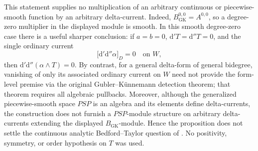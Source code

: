 \begin{proposition}
This statement supplies no multiplication of an arbitrary continuous or
piecewise-smooth function by an arbitrary delta-current.  Indeed,
\(B_{\mathrm{GK}}^{0,0}=A^{0,0}\), so a degree-zero multiplier in the
displayed module is smooth.  In this smooth degree-zero case there is a
useful sharper conclusion: if \(a=b=0\),
\(\mathrm d'T=\mathrm d''T=0\), and the single ordinary current
\begin{equation}
 \bigl[\mathrm d'\mathrm d''\alpha\bigr]_{D}=0
 \quad\text{on }W,
 \label{eq:p21p3-smooth-single-current}
\end{equation}
then \(\mathrm d'\mathrm d''(\alpha\wedge T)=0\).  By contrast, for a
general delta-form of general bidegree, vanishing of only its associated
ordinary current on \(W\) need not provide the form-level premise via the
original Gubler--K\"unnemann detection theorem; that theorem requires all
algebraic pullbacks.  Moreover, although the generalized piecewise-smooth
space \(P\!S\!P\) is an algebra and its elements define delta-currents, the
construction does not furnish a \(P\!S\!P\)-module structure on arbitrary
delta-currents extending the displayed \(B_{\mathrm{GK}}\)-module.  Hence
the proposition does not settle the continuous analytic Bedford--Taylor
question of
\cite[\S8.6.1 and Definition~8.6.2]{CLD25}.
No positivity, symmetry, or order hypothesis on \(T\) was used.
\end{proposition}
